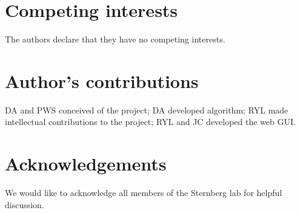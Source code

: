 \documentclass[linenumbers, doublespacing]{bmcart}
\begin{document}
\begin{backmatter}

\section*{Competing interests}
 	The authors declare that they have no competing interests.
\section*{Author's contributions}
    DA and PWS conceived of the project; DA developed algorithm;
	RYL made intellectual contributions to the project; RYL and JC
	developed the web GUI.
\section*{Acknowledgements}
	We would like to acknowledge all members of the Sternberg
	lab for helpful discussion.

\nocite{label}




\end{backmatter}
\end{document}
